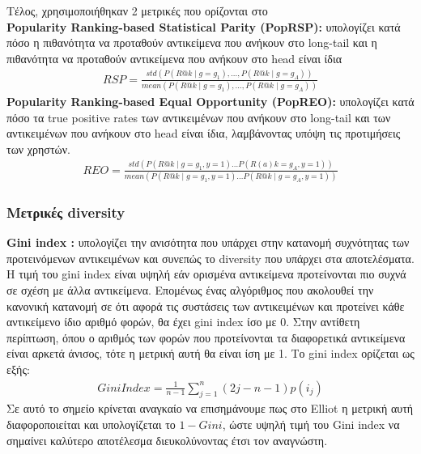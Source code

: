 \noindent Τέλος, χρησιμοποιήθηκαν 2 μετρικές που ορίζονται στο \cite{zhuMeasuringMitigatingItem2020}\\
\textbf{Popularity Ranking-based Statistical Parity (PopRSP):} υπολογίζει κατά πόσο η πιθανότητα να προταθούν αντικείμενα που ανήκουν στο long-tail και η πιθανότητα να προταθούν αντικείμενα που ανήκουν στο head είναι ίδια
\begin{align}
	{RSP}=\frac{{std}\left(P\left(R @ k \mid g=g_{1}\right), \ldots, P\left(R @ k \mid g=g_{A}\right)\right)}
	{{mean}\left(P\left(R @ k \mid g=g_{1}\right), \ldots, P\left(R @ k \mid g=g_{A}\right)\right)}
\end{align}
\textbf{Popularity Ranking-based Equal Opportunity (PopREO):} υπολογίζει κατά πόσο τα true positive rates των αντικειμένων που ανήκουν στο long-tail και των αντικειμένων που ανήκουν στο head είναι ίδια, λαμβάνοντας υπόψη τις προτιμήσεις των χρηστών. 
\begin{align}
	{REO}=\frac{{std}\left(P\left(R @ k \mid g=g_{1}, y=1\right) \ldots P\left(R(a) k=g_{A}, y=1\right)\right)}
	{{mean}\left(P\left(R @ k \mid g=g_{1}, y=1\right) \ldots P\left(R @ k \mid g=g_{A}, y=1\right)\right)}
\end{align}
\subsubsection{Μετρικές diversity}
\noindent \textbf{Gini index \cite{giniMeasurementInequalityIncomes1921}:} υπολογίζει την ανισότητα που υπάρχει στην κατανομή συχνότητας των προτεινόμενων αντικειμένων και συνεπώς το diversity που υπάρχει στα αποτελέσματα. Η τιμή του gini index είναι υψηλή εάν ορισμένα αντικείμενα προτείνονται πιο συχνά σε σχέση με άλλα αντικείμενα. Επομένως ένας αλγόριθμος που ακολουθεί την κανονική κατανομή σε ότι αφορά τις συστάσεις των αντικειμένων και προτείνει κάθε αντικείμενο ίδιο αριθμό φορών, θα έχει gini index ίσο με $ 0 $. Στην αντίθετη περίπτωση, όπου ο αριθμός των φορών που προτείνονται τα διαφορετικά αντικείμενα είναι αρκετά άνισος, τότε η μετρική αυτή θα είναι ίση με 1. Το gini index ορίζεται ως εξής:
\begin{align}
	{GiniIndex}=\frac{1}{n-1} \sum_{j=1}^{n}(2 j-n-1) p\left(i_{j}\right)
\end{align}
Σε αυτό το σημείο κρίνεται αναγκαίο να επισημάνουμε πως στο Elliot η μετρική αυτή διαφοροποιείται και υπολογίζεται το $ 1 - Gini $, ώστε υψηλή τιμή του Gini index να σημαίνει καλύτερο αποτέλεσμα διευκολύνοντας έτσι τον αναγνώστη. 
